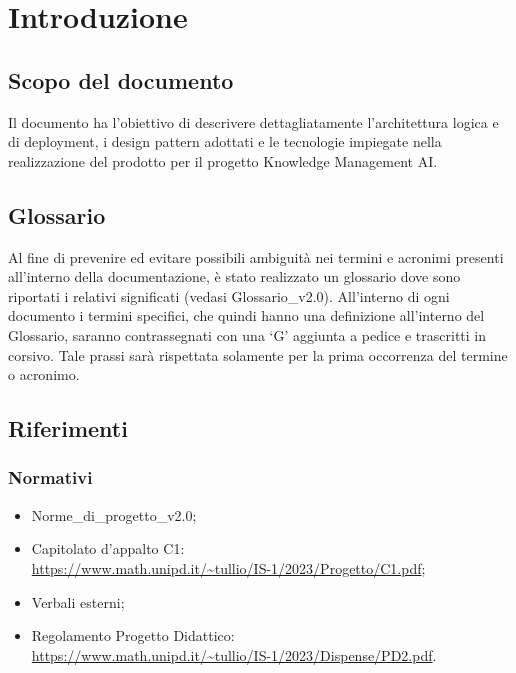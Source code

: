 \chapter{Introduzione} \label{cap:intro}
\section{Scopo del documento}
Il documento ha l'obiettivo di descrivere dettagliatamente l'architettura logica e di deployment, i design pattern adottati e le tecnologie impiegate nella realizzazione del prodotto per il progetto Knowledge Management AI.
\section{Glossario}
Al fine di prevenire ed evitare possibili ambiguità nei termini e acronimi presenti all’interno della documentazione, è stato realizzato un glossario dove sono riportati i relativi significati (vedasi Glossario\_v2.0). All’interno di ogni documento i termini specifici, che quindi hanno una definizione all’interno del Glossario, saranno contrassegnati con una ‘G’ aggiunta a pedice e trascritti in corsivo. Tale prassi sarà rispettata solamente per la prima occorrenza del termine o acronimo.
\section{Riferimenti}
\subsection{Normativi}
\begin{itemize}
    \item Norme\_di\_progetto\_v2.0;
    \item Capitolato d'appalto C1: \\ \url{https://www.math.unipd.it/~tullio/IS-1/2023/Progetto/C1.pdf};
    \item Verbali esterni;
    \item Regolamento Progetto Didattico: \\
    \url{https://www.math.unipd.it/~tullio/IS-1/2023/Dispense/PD2.pdf}.
\end{itemize}

